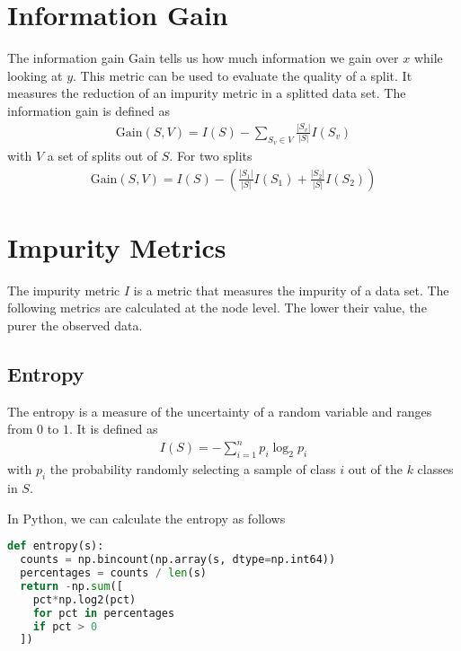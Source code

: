 \section{Information Gain}
The information gain $\text{Gain}$ tells us how much information we gain over $x$ while looking at $y$.
This metric can be used to evaluate the quality of a split. It measures the reduction
of an impurity metric in a splitted data set.
The information gain is defined as
\begin{align}
  \text{Gain}(S, V) = I(S) - \sum_{S_v\in V} \frac{|S_v|}{|S|}I(S_v)
\end{align}
with $V$ a set of splits out of $S$.  
For two splits
\begin{align}
\text{Gain}(S, V) = I(S) - \left(\frac{|S_1|}{|S|}I(S_1)+\frac{|S_2|}{|S|}I(S_2)\right)
\end{align}

\section{Impurity Metrics}
The impurity metric $I$ is a metric that measures the impurity of a data set.
The following metrics are calculated at the node level. The lower their value, the purer the observed data.
\subsection{Entropy}
The entropy is a measure of the uncertainty of a random variable and ranges from $0$ to $1$. It is defined as
\begin{align}
  I(S) = -\sum_{i=1}^n p_i \log_2 p_i
\end{align}
with $p_i$ the probability randomly selecting a sample of class $i$ out of the $k$ classes in $S$.

In Python, we can calculate the entropy as follows
\begin{lstlisting}[language=Python]
def entropy(s):
  counts = np.bincount(np.array(s, dtype=np.int64))
  percentages = counts / len(s)
  return -np.sum([
    pct*np.log2(pct)
    for pct in percentages
    if pct > 0
  ])
\end{lstlisting}

